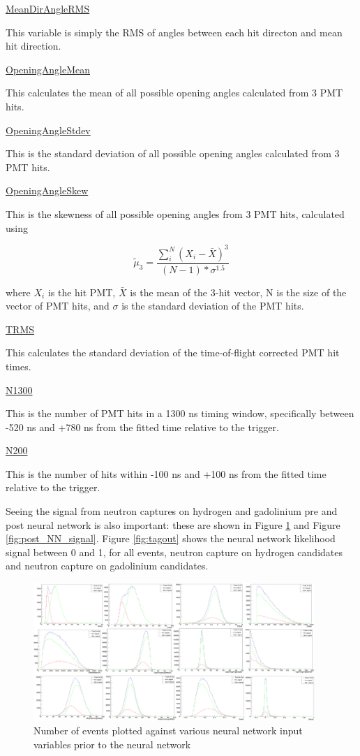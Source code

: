 \underline{MeanDirAngleRMS}

This variable is simply the RMS of angles between each hit directon and mean hit direction.

\underline{OpeningAngleMean}

This calculates the mean of all possible opening angles calculated from 3 PMT hits.

\underline{OpeningAngleStdev}

This is the standard deviation of all possible opening angles calculated from 3 PMT hits.

\underline{OpeningAngleSkew}

This is the skewness of all possible opening angles from 3 PMT hits, calculated using

\begin{equation}
    \tilde{\mu}_3=\frac{\sum_i^N\left(X_i-\bar{X}\right)^3}{(N-1) * \sigma^{1.5}}
\end{equation}

where $X_{i}$ is the hit PMT, $\bar{X}$ is the mean of the 3-hit vector, N is the size of the vector of PMT hits, and $\sigma$ is the standard deviation of the PMT hits.

\underline{TRMS}

This calculates the standard deviation of the time-of-flight corrected PMT hit times.

\underline{N1300}

This is the number of PMT hits in a 1300 ns timing window, specifically between -520 ns and +780 ns from the fitted time relative to the trigger.       

\underline{N200}

This is the number of hits within -100 ns and +100 ns from the fitted time relative to the trigger.

Seeing the signal from neutron captures on hydrogen and gadolinium pre and post neural network is also important: these are shown in Figure \ref{fig:pre_NN_signal} and Figure \ref{fig:post_NN_signal}. Figure \ref{fig:tagout} shows the neural network likelihood signal between 0 and 1, for all events, neutron capture on hydrogen candidates and neutron capture on gadolinium candidates. 

\begin{figure}
    \centering
    \includegraphics[width=0.95\textwidth]{Figures/pre_nn_var.png}
    \caption{Number of events plotted against various neural network input variables prior to the neural network }
    \label{fig:pre_NN_signal}

\end{figure}

